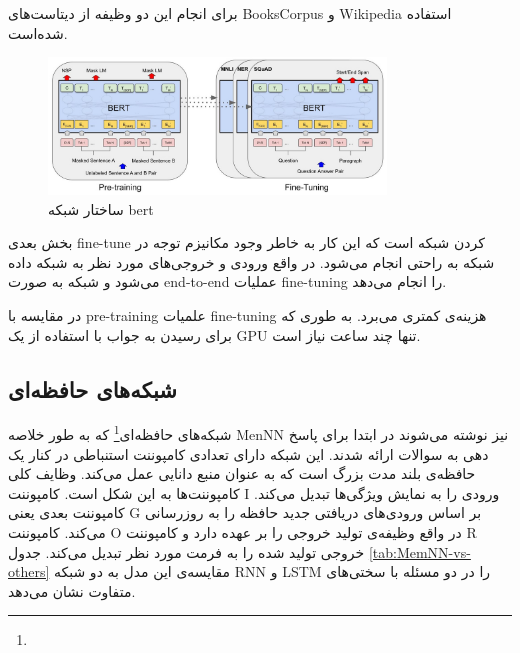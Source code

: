 \documentclass[12pt, a4paper, oneside]{report}
\begin{document}
برای انجام این دو وظیفه از دیتاست‌های
BooksCorpus
و
Wikipedia
استفاده شده‌است. 

\begin{figure}[!ht]
    \centering
    \includegraphics[width=0.8\textwidth]{bert}
    \caption{ ساختار شبکه bert }
    \label{fig:bert}
\end{figure}

بخش بعدی
fine-tune
کردن شبکه است که این کار به خاطر وجود مکانیزم توجه در شبکه به راحتی انجام می‌شود.
در واقع ورودی و خروجی‌های مورد نظر به شبکه داده می‌شود و شبکه به صورت
end-to-end
عملیات
fine-tuning
را انجام می‌دهد.

در مقایسه با
pre-training
علمیات
fine-tuning
هزینه‌ی کمتری می‌برد. به طوری که برای رسیدن به جواب با استفاده از یک
GPU
تنها چند ساعت نیاز است.\cite{devlin2018bert}



\subsection{شبکه‌های حافظه‌ای}
شبکه‌های حافظه‌ای\footnote{}
که به طور خلاصه
MenNN
نیز نوشته می‌شوند در ابتدا برای پاسخ دهی به سوالات ارائه شدند. این شبکه دارای تعدادی کامپوننت استنباطی در کنار یک
حافظه‌ی بلند مدت بزرگ است که به عنوان منبع دانایی عمل می‌کند. وظایف کلی کامپوننت‌ها به این شکل است. کامپوننت
I
ورودی را به نمایش ویژگی‌ها تبدیل می‌کند. کامپوننت بعدی یعنی
G
بر اساس ورودی‌های دریافتی جدید حافظه را به روزرسانی می‌کند. کامپوننت
O
در واقع وظیفه‌ی تولید خروجی را بر عهده دارد و کامپوننت
R
خروجی تولید شده را به فرمت مورد نظر تبدیل می‌کند. جدول
\ref{tab:MemNN-vs-others}
مقایسه‌ی این مدل به دو شبکه
RNN
و
LSTM
را در دو مسئله با سختی‌های متفاوت نشان می‌دهد.
\cite{zhang2018deep}
\end{document}
